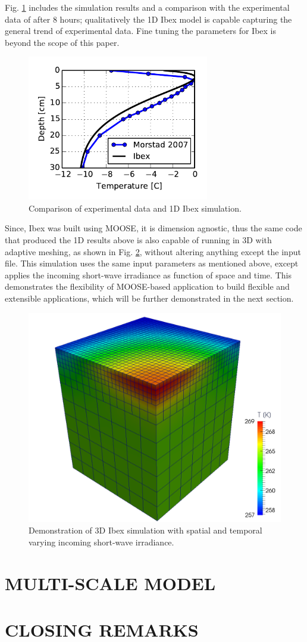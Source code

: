 Fig. \ref{fig:ibex_1d} includes the simulation results and a comparison with the experimental data of \citet{morstad2007experimental} after 8 hours; qualitatively the 1D Ibex model is capable capturing the general trend of experimental data. Fine tuning the parameters for Ibex is beyond the scope of this paper.

\begin{figure}[h]
  \includegraphics[width=3.125in]{figures/ibex.pdf}
  \caption{Comparison of experimental data and 1D Ibex simulation.}
  \label{fig:ibex_1d}
\end{figure}

Since, Ibex was built using MOOSE, it is dimension agnostic, thus the same code that produced the 1D results above is also capable of running in 3D with adaptive meshing, as shown in Fig. \ref{fig:ibex_3d}, without altering anything except the input file. This simulation uses the same input parameters as mentioned above, except applies the incoming short-wave irradiance as function of space and time. This demonstrates the flexibility of MOOSE-based application to build flexible and extensible applications, which will be further demonstrated in the next section.

\begin{figure}
  \includegraphics[width=\linewidth]{figures/ibex3d.pdf}
  \caption{Demonstration of 3D Ibex simulation with spatial and temporal varying incoming short-wave irradiance.}
  \label{fig:ibex_3d}
\end{figure}


\section{MULTI-SCALE MODEL}\label{sec:yeti}


\section{CLOSING REMARKS}
